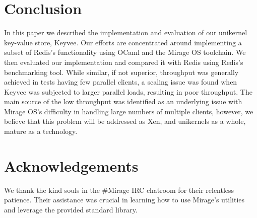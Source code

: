 \documentclass[english,10pt,twocolumn]{article}
\begin{document}
\section{Conclusion}
In this paper we described the implementation and evaluation of our unikernel key-value store, Keyvee.
Our efforts are concentrated around implementing a subset of Redis's functionality using OCaml and the Mirage OS toolchain.
We then evaluated our implementation and compared it with Redis using Redis's benchmarking tool.
While similar, if not superior, throughput was generally achieved in tests having few parallel clients, a scaling issue was found when Keyvee was subjected to larger parallel loads, resulting in poor throughput.
The main source of the low throughput was identified as an underlying issue with Mirage OS's difficulty in handling large numbers of multiple clients, however, we believe that this problem will be addressed as Xen, and unikernels as a whole, mature as a technology.

\section{Acknowledgements}
We thank the kind souls in the \#Mirage IRC chatroom for their relentless patience.
Their assistance was crucial in learning how to use Mirage's utilities and leverage the provided standard library.





\end{document}
